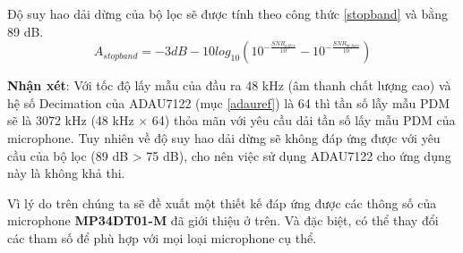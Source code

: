 Độ suy hao dải dừng của bộ lọc sẽ được tính theo công thức \ref{stopband} \cite{pdm2pcm} và bằng 89 dB.
\begin{equation} \label{stopband}
    A_{stop band} = -3dB - 10log_{10}{(10^{-\displaystyle\frac{SNR_{after}}{10}}-10^{-\displaystyle\frac{SNR_{before}}{10}})}
\end{equation}

\noindent \textbf{Nhận xét}: Với tốc độ lấy mẫu của đầu ra 48 kHz (âm thanh chất lượng cao) và hệ số Decimation của ADAU7122 (mục \ref{adauref}) là 64 thì tần số lẫy mẫu PDM sẽ là 3072 kHz (48 kHz $\times$ 64) thỏa mãn với yêu cầu dải tần số lấy mẫu PDM của microphone. Tuy nhiên về độ suy hao dải dừng sẽ không đáp ứng được với yêu cầu của bộ lọc (89 dB > 75 dB), cho nên việc sử dụng ADAU7122 cho ứng dụng này là không khả thi.

Vì lý do trên chúng ta sẽ đề xuất một thiết kế đáp ứng được các thông số của microphone \textbf{MP34DT01-M} đã giới thiệu ở trên. Và đặc biệt, có thể thay đổi các tham số để phù hợp với mọi loại microphone cụ thể.

